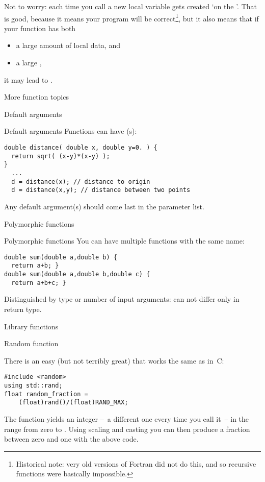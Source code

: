 Not to worry: each time you call  a new local variable
 gets created `on the '. That is good, because it means your program
will be correct\footnote{Historical note: very old versions of Fortran
  did not do this, and so recursive functions were basically
  impossible.}, but it also means that if your function has both
\begin{itemize}
\item a large amount of local data, and
\item a large ,
\end{itemize}
it may lead to .

 {More function topics}

 {Default arguments}

\begin{block}{Default arguments}
  \label{sl:def-arg}
  Functions can have (s):
\begin{verbatim}
double distance( double x, double y=0. ) {
  return sqrt( (x-y)*(x-y) );
}
  ...
  d = distance(x); // distance to origin
  d = distance(x,y); // distance between two points
\end{verbatim}
Any default argument(s) should come last in the parameter list.
\end{block}

 {Polymorphic functions}
\label{sec:polyfunc}

\begin{block}{Polymorphic functions}
  \label{sl:func-poly}
  You can have multiple functions with the same name:
\begin{verbatim}
double sum(double a,double b) {
  return a+b; }
double sum(double a,double b,double c) {
  return a+b+c; }
\end{verbatim}
Distinguished by type or number of input arguments: can not differ only in return type.
\end{block}

 {Library functions}

 {Random function}
\label{sed:crand}

There is an easy (but not terribly great)  that
works the same as in~C:

\begin{verbatim}
#include <random>
using std::rand;
float random_fraction =
    (float)rand()/(float)RAND_MAX;
\end{verbatim}
The function  yields an integer --~a different one
every time you call it~-- in the range from zero to
.
Using scaling and casting you can then produce a fraction between zero
and one with the above code.

